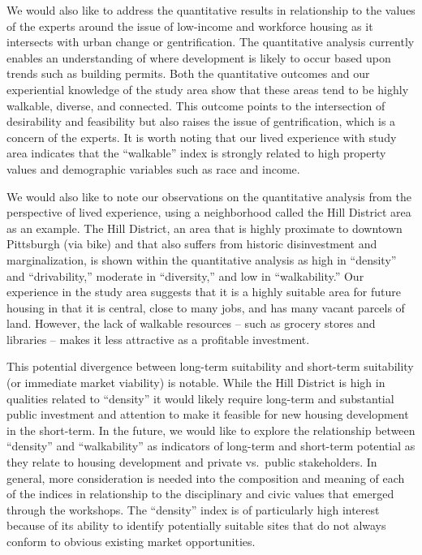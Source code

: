 \documentclass[
]{book}
\begin{document}
We would also like to address the quantitative results in relationship to the values of the experts around the issue of low-income and workforce housing as it intersects with urban change or gentrification. The quantitative analysis currently enables an understanding of where development is likely to occur based upon trends such as building permits. Both the quantitative outcomes and our experiential knowledge of the study area show that these areas tend to be highly walkable, diverse, and connected. This outcome points to the intersection of desirability and feasibility but also raises the issue of gentrification, which is a concern of the experts. It is worth noting that our lived experience with study area indicates that the ``walkable'' index is strongly related to high property values and demographic variables such as race and income.

We would also like to note our observations on the quantitative analysis from the perspective of lived experience, using a neighborhood called the Hill District area as an example. The Hill District, an area that is highly proximate to downtown Pittsburgh (via bike) and that also suffers from historic disinvestment and marginalization, is shown within the quantitative analysis as high in ``density'' and ``drivability,'' moderate in ``diversity,'' and low in ``walkability.'' Our experience in the study area suggests that it is a highly suitable area for future housing in that it is central, close to many jobs, and has many vacant parcels of land. However, the lack of walkable resources -- such as grocery stores and libraries -- makes it less attractive as a profitable investment.

This potential divergence between long-term suitability and short-term suitability (or immediate market viability) is notable. While the Hill District is high in qualities related to ``density'' it would likely require long-term and substantial public investment and attention to make it feasible for new housing development in the short-term. In the future, we would like to explore the relationship between ``density'' and ``walkability'' as indicators of long-term and short-term potential as they relate to housing development and private vs.~public stakeholders. In general, more consideration is needed into the composition and meaning of each of the indices in relationship to the disciplinary and civic values that emerged through the workshops. The ``density'' index is of particularly high interest because of its ability to identify potentially suitable sites that do not always conform to obvious existing market opportunities.
\end{document}
